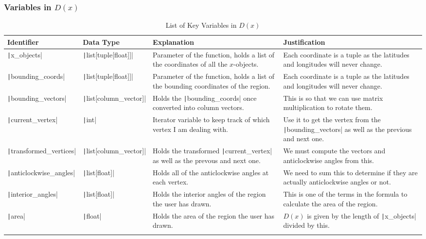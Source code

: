 \documentclass[12pt]{report}
\newcommand{\pil}[1]{\protect\texttt|#1|}
\begin{document}
\subsubsection{Variables in $D\left(x\right)$}
\begin{center}
\begin{longtable}{ | m{3cm} | m{4cm}| m{4cm} | m{4cm} |} 
    \hline
    \textbf{Identifier} & \textbf{Data Type} & \textbf{Explanation}  & \textbf{Justification} \\ 
    \hline
    \pil{x_objects} & \pil{list[tuple[float]]} & Parameter of the function, holds a list of the coordinates of all the $x$-objects. & Each coordinate is a tuple as the latitudes and longitudes will never change. \\ 
    \hline
    \pil{bounding_coords} & \pil{list[tuple[float]]} & Parameter of the function, holds a list of the bounding coordinates of the region. & Each coordinate is a tuple as the latitudes and longitudes will never change. \\ 
    \hline
    \pil{bounding_vectors} & \pil{list[column_vector]} & Holds the \pil{bounding_coords} once converted into column vectors. & This is so that we can use matrix multiplication to rotate them. \\ 
    \hline
    \pil{current_vertex} & \pil{int} & Iterator variable to keep track of which vertex I am dealing with. & Use it to get the vertex from the \pil{bounding_vectors} as well as the previous and next one. \\ 
    \hline
    \pil{transformed_vertices} & \pil{list[column_vector]} & Holds the transformed \pil{current_vertex} as well as the prevous and next one. & We must compute the vectors and anticlockwise angles from this. \\ 
    \hline
    \pil{anticlockwise_angles} & \pil{list[float]} & Holds all of the anticlockwise angles at each vertex. & We need to sum this to determine if they are actually anticlockwise angles or not. \\ 
    \hline
    \pil{interior_angles} & \pil{list[float]} & Holds the interior angles of the region the user has drawn. & This is one of the terms in the formula to calculate the area of the region. \\ 
    \hline
    \pil{area} & \pil{float} & Holds the area of the region the user has drawn. & $D\left(x\right)$ is given by the length of \pil{x_objects} divided by this. \\ 
    \hline
\caption{List of Key Variables in $D\left(x\right)$}
\end{longtable}
\end{center}
\end{document}
